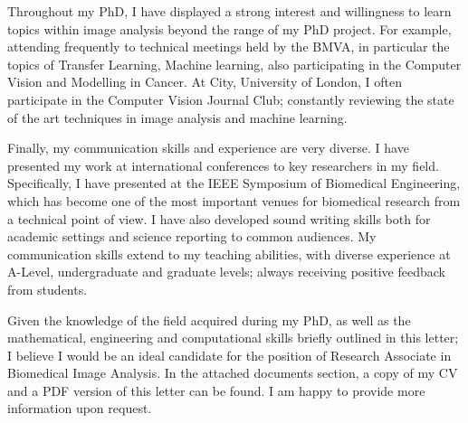 \documentclass[10pt,a4paper,sans]{moderncv}
\begin{document}
Throughout my PhD, I have displayed a strong interest and willingness to learn topics within image analysis beyond the range of my PhD project. For example, attending frequently to technical meetings held by the BMVA, in particular the topics of Transfer Learning, Machine learning, also participating in the Computer Vision and Modelling in Cancer. At City, University of London, I often participate in the Computer Vision Journal Club; constantly reviewing the state of the art techniques in image analysis and machine learning.

Finally, my communication skills and experience are very diverse. I have presented my work at international conferences to key researchers in my field. Specifically, I have presented at the IEEE Symposium of Biomedical Engineering, which has become one of the most important venues for biomedical research from a technical point of view. I have also developed sound writing skills both for academic settings and science reporting to common audiences. My communication skills extend to my teaching abilities, with diverse experience at A-Level, undergraduate and graduate levels; always receiving positive feedback from students.

Given the knowledge of the field acquired during my PhD, as well as the mathematical, engineering and computational skills briefly outlined in this letter; I believe I would be an ideal candidate for the position of Research Associate in Biomedical Image Analysis. In the attached documents section, a copy of my CV and a PDF version of this letter can be found. I am happy to provide more information upon request.

\makeletterclosing
\end{document}
